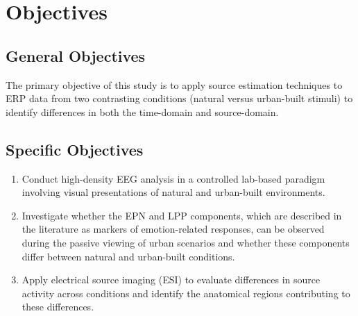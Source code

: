 \section{Objectives}
\label{section:objectives}

\subsection{General Objectives}

The primary objective of this study is to apply source estimation techniques to ERP data from two contrasting conditions (natural versus urban-built stimuli) to identify differences in both the time-domain and source-domain.

\subsection{Specific Objectives}

\begin{enumerate}
	\item Conduct high-density EEG analysis in a controlled lab-based paradigm involving visual presentations of natural and urban-built environments.
	
	\item Investigate whether the EPN and LPP components, which are described in the literature as markers of emotion-related responses, can be observed during the passive viewing of urban scenarios and whether these components differ between natural and urban-built conditions.
	
	\item Apply electrical source imaging (ESI) to evaluate differences in source activity across conditions and identify the anatomical regions contributing to these differences.
\end{enumerate}